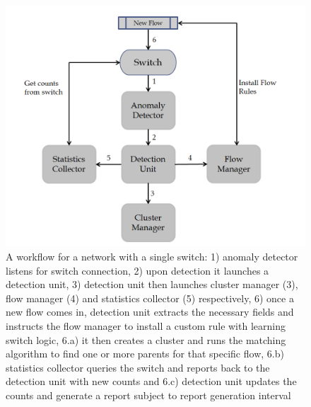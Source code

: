 \documentclass[twocolumn]{article}
\begin{document}
\begin{figure}[!ht]
\centering
	\includegraphics[scale=0.3]{images/workflow.png}
\caption{A workflow for a network with a single switch: 1) anomaly detector listens for switch connection, 2) upon detection it launches a detection unit, 3) detection unit then launches cluster manager (3), flow manager (4) and statistics collector (5) respectively, 6) once a new flow comes in, detection unit extracts the necessary fields and instructs the flow manager to install a custom rule with learning switch logic, 6.a) it then creates a cluster and runs the matching algorithm to find one or more parents for that specific flow, 6.b) statistics collector queries the switch and reports back to the detection unit with new counts and 6.c) detection unit updates the counts and generate a report subject to report generation interval}
\label{fig:workflow}
\end{figure}
\end{document}
